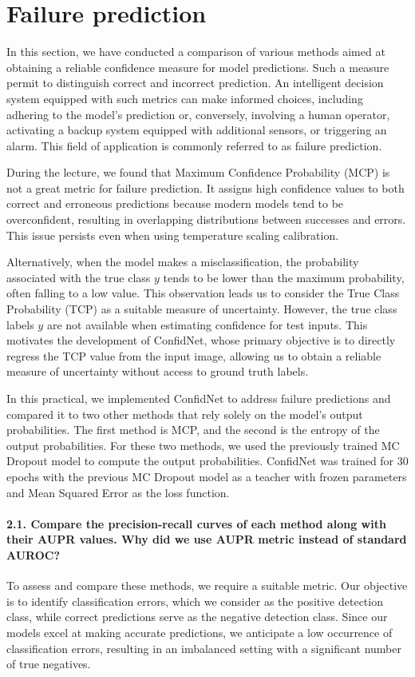 \section{Failure prediction}
In this section, we have conducted a comparison of various methods aimed at obtaining a reliable confidence measure for model predictions. Such a measure permit to distinguish correct and incorrect prediction. An intelligent decision system equipped with such metrics can make informed choices, including adhering to the model's prediction or, conversely, involving a human operator, activating a backup system equipped with additional sensors, or triggering an alarm. This field of application is commonly referred to as failure prediction.

During the lecture, we found that Maximum Confidence Probability (MCP) is not a great metric for failure prediction. It assigns high confidence values to both correct and erroneous predictions because modern models tend to be overconfident, resulting in overlapping distributions between successes and errors. This issue persists even when using temperature scaling calibration.

Alternatively, when the model makes a misclassification, the probability associated with the true class $y$ tends to be lower than the maximum probability, often falling to a low value. This observation leads us to consider the True Class Probability (TCP) as a suitable measure of uncertainty. However, the true class labels $y$ are not available when estimating confidence for test inputs. This motivates the development of ConfidNet, whose primary objective is to directly regress the TCP value from the input image, allowing us to obtain a reliable measure of uncertainty without access to ground truth labels.

In this practical, we implemented ConfidNet to address failure predictions and compared it to two other methods that rely solely on the model's output probabilities. The first method is MCP, and the second is the entropy of the output probabilities. For these two methods, we used the previously trained MC Dropout model to compute the output probabilities. ConfidNet was trained for 30 epochs with the previous MC Dropout model as a teacher with frozen parameters and Mean Squared Error as the loss function.

\paragraph*{2.1. Compare the precision-recall curves of each method along with their AUPR values. Why did we use AUPR metric instead of standard AUROC?}
To assess and compare these methods, we require a suitable metric. Our objective is to identify classification errors, which we consider as the positive detection class, while correct predictions serve as the negative detection class. Since our models excel at making accurate predictions, we anticipate a low occurrence of classification errors, resulting in an imbalanced setting with a significant number of true negatives.

